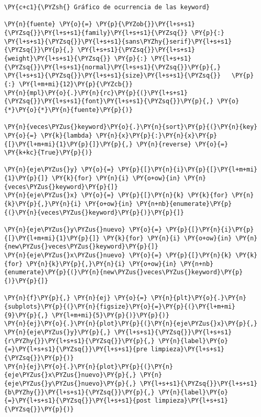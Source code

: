     \begin{tcolorbox}[breakable, size=fbox, boxrule=1pt, pad at break*=1mm,colback=cellbackground, colframe=cellborder]
\begin{Verbatim}[commandchars=\\\{\}]
\PY{c+c1}{\PYZsh{} Gráfico de ocurrencia de las keyword}

\PY{n}{fuente} \PY{o}{=} \PY{p}{\PYZob{}}\PY{l+s+s1}{\PYZsq{}}\PY{l+s+s1}{family}\PY{l+s+s1}{\PYZsq{}} \PY{p}{:} \PY{l+s+s1}{\PYZsq{}}\PY{l+s+s1}{sans\PYZhy{}serif}\PY{l+s+s1}{\PYZsq{}}\PY{p}{,} \PY{l+s+s1}{\PYZsq{}}\PY{l+s+s1}{weight}\PY{l+s+s1}{\PYZsq{}} \PY{p}{:} \PY{l+s+s1}{\PYZsq{}}\PY{l+s+s1}{normal}\PY{l+s+s1}{\PYZsq{}}\PY{p}{,} \PY{l+s+s1}{\PYZsq{}}\PY{l+s+s1}{size}\PY{l+s+s1}{\PYZsq{}}   \PY{p}{:} \PY{l+m+mi}{12}\PY{p}{\PYZcb{}}
\PY{n}{mpl}\PY{o}{.}\PY{n}{rc}\PY{p}{(}\PY{l+s+s1}{\PYZsq{}}\PY{l+s+s1}{font}\PY{l+s+s1}{\PYZsq{}}\PY{p}{,} \PY{o}{*}\PY{o}{*}\PY{n}{fuente}\PY{p}{)}

\PY{n}{veces\PYZus{}keyword}\PY{o}{.}\PY{n}{sort}\PY{p}{(}\PY{n}{key} \PY{o}{=} \PY{k}{lambda} \PY{n}{x}\PY{p}{:}\PY{n}{x}\PY{p}{[}\PY{l+m+mi}{1}\PY{p}{]}\PY{p}{,} \PY{n}{reverse} \PY{o}{=} \PY{k+kc}{True}\PY{p}{)}

\PY{n}{eje\PYZus{}y} \PY{o}{=} \PY{p}{[}\PY{n}{i}\PY{p}{[}\PY{l+m+mi}{1}\PY{p}{]} \PY{k}{for} \PY{n}{i} \PY{o+ow}{in} \PY{n}{veces\PYZus{}keyword}\PY{p}{]}
\PY{n}{eje\PYZus{}x} \PY{o}{=} \PY{p}{[}\PY{n}{k} \PY{k}{for} \PY{n}{k}\PY{p}{,}\PY{n}{i} \PY{o+ow}{in} \PY{n+nb}{enumerate}\PY{p}{(}\PY{n}{veces\PYZus{}keyword}\PY{p}{)}\PY{p}{]}

\PY{n}{eje\PYZus{}y\PYZus{}nuevo} \PY{o}{=} \PY{p}{[}\PY{n}{i}\PY{p}{[}\PY{l+m+mi}{1}\PY{p}{]} \PY{k}{for} \PY{n}{i} \PY{o+ow}{in} \PY{n}{new\PYZus{}veces\PYZus{}keyword}\PY{p}{]}
\PY{n}{eje\PYZus{}x\PYZus{}nuevo} \PY{o}{=} \PY{p}{[}\PY{n}{k} \PY{k}{for} \PY{n}{k}\PY{p}{,}\PY{n}{i} \PY{o+ow}{in} \PY{n+nb}{enumerate}\PY{p}{(}\PY{n}{new\PYZus{}veces\PYZus{}keyword}\PY{p}{)}\PY{p}{]}

\PY{n}{f}\PY{p}{,} \PY{n}{ej} \PY{o}{=} \PY{n}{plt}\PY{o}{.}\PY{n}{subplots}\PY{p}{(}\PY{n}{figsize}\PY{o}{=}\PY{p}{(}\PY{l+m+mi}{9}\PY{p}{,} \PY{l+m+mi}{5}\PY{p}{)}\PY{p}{)}
\PY{n}{ej}\PY{o}{.}\PY{n}{plot}\PY{p}{(}\PY{n}{eje\PYZus{}x}\PY{p}{,} \PY{n}{eje\PYZus{}y}\PY{p}{,} \PY{l+s+s1}{\PYZsq{}}\PY{l+s+s1}{r\PYZhy{}}\PY{l+s+s1}{\PYZsq{}}\PY{p}{,} \PY{n}{label}\PY{o}{=}\PY{l+s+s1}{\PYZsq{}}\PY{l+s+s1}{pre limpieza}\PY{l+s+s1}{\PYZsq{}}\PY{p}{)}
\PY{n}{ej}\PY{o}{.}\PY{n}{plot}\PY{p}{(}\PY{n}{eje\PYZus{}x\PYZus{}nuevo}\PY{p}{,} \PY{n}{eje\PYZus{}y\PYZus{}nuevo}\PY{p}{,} \PY{l+s+s1}{\PYZsq{}}\PY{l+s+s1}{b\PYZhy{}}\PY{l+s+s1}{\PYZsq{}}\PY{p}{,} \PY{n}{label}\PY{o}{=}\PY{l+s+s1}{\PYZsq{}}\PY{l+s+s1}{post limpieza}\PY{l+s+s1}{\PYZsq{}}\PY{p}{)}


\end{Verbatim}
\end{tcolorbox}
